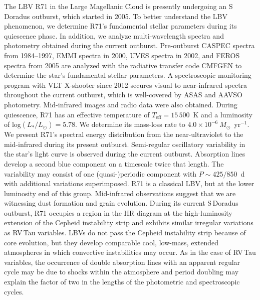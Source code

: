 \documentclass[structabstract]{aa}
\begin{document}
 {The LBV R71 in the Large Magellanic Cloud is presently undergoing an S\,Doradus outburst, which started in 2005. To better understand the LBV phenomenon, we determine R71's fundamental stellar parameters during its quiescence phase. In addition, we analyze multi-wavelength spectra and photometry obtained during the current outburst.} {Pre-outburst CASPEC spectra from 1984--1997, EMMI spectra in 2000, UVES spectra in 2002, and FEROS spectra from 2005 are analyzed with the radiative transfer code CMFGEN to determine the star's fundamental stellar parameters. A spectroscopic monitoring program with VLT X-shooter since 2012 secures visual to near-infrared spectra throughout the current outburst, which is well-covered by ASAS and AAVSO photometry. Mid-infrared images and radio data were also obtained.} {During quiescence, R71 has an effective temperature of $T_{\mathrm{eff}} = 15\,500$~K and a luminosity of log$(L_*/L_{\odot})= 5.78$. We determine its mass-loss rate to $4.0 \times 10^{-6}~M_{\odot}$~yr$^{-1}$.  We present R71's spectral energy distribution from the near-ultraviolet to the mid-infrared during its present outburst. Semi-regular oscillatory variability in the star's light curve is observed during the current outburst. Absorption lines develop a second blue component on a timescale twice that length. The variability may consist of one (quasi-)periodic component with $P \sim 425/850$~d with additional variations superimposed.} {R71 is a classical LBV, but at the lower luminosity end of this group. Mid-infrared observations suggest that we are witnessing dust formation and grain evolution. During its current S\,Doradus outburst, R71 occupies a region in the HR diagram at the high-luminosity extension of the Cepheid instability strip and exhibits similar irregular variations as RV\,Tau variables. LBVs do not pass the Cepheid instability strip because of core evolution, but they develop comparable cool, low-mass, extended atmospheres in which convective instabilities may occur. As in the case of RV\,Tau variables, the occurrence of double absorption lines with an apparent regular cycle may be due to shocks within the atmosphere and period doubling may explain the factor of two in the lengths of the photometric and spectroscopic cycles.} 
\end{document}
